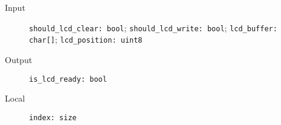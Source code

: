 \begin{flushleft}
  \begin{description}
    \item [Input]
      \verb#should_lcd_clear: bool#;
      \verb#should_lcd_write: bool#;
      \verb#lcd_buffer: char[]#;
      \verb#lcd_position: uint8#
    \item [Output]
      \verb#is_lcd_ready: bool#
    \item [Local]
      \verb#index: size#
  \end{description}
\end{flushleft}
